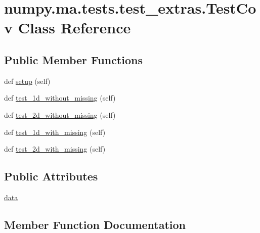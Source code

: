 \hypertarget{classnumpy_1_1ma_1_1tests_1_1test__extras_1_1TestCov}{}\section{numpy.\+ma.\+tests.\+test\+\_\+extras.\+Test\+Cov Class Reference}
\label{classnumpy_1_1ma_1_1tests_1_1test__extras_1_1TestCov}
\subsection*{Public Member Functions}
\begin{DoxyCompactItemize}
\item 
def \hyperlink{classnumpy_1_1ma_1_1tests_1_1test__extras_1_1TestCov_af70f7561cb4532728f821f8801599429}{setup} (self)
\item 
def \hyperlink{classnumpy_1_1ma_1_1tests_1_1test__extras_1_1TestCov_ae62ba38c254eceadd736d201bf7806ff}{test\+\_\+1d\+\_\+without\+\_\+missing} (self)
\item 
def \hyperlink{classnumpy_1_1ma_1_1tests_1_1test__extras_1_1TestCov_affe3808636bf0fb4e0b767e574505f16}{test\+\_\+2d\+\_\+without\+\_\+missing} (self)
\item 
def \hyperlink{classnumpy_1_1ma_1_1tests_1_1test__extras_1_1TestCov_a55553c4677fbbbce459e7cfe34913bc8}{test\+\_\+1d\+\_\+with\+\_\+missing} (self)
\item 
def \hyperlink{classnumpy_1_1ma_1_1tests_1_1test__extras_1_1TestCov_a24516de19ee9a805d8f28bfeae8e1075}{test\+\_\+2d\+\_\+with\+\_\+missing} (self)
\end{DoxyCompactItemize}
\subsection*{Public Attributes}
\begin{DoxyCompactItemize}
\item 
\hyperlink{classnumpy_1_1ma_1_1tests_1_1test__extras_1_1TestCov_af3324a06d29845f8c10efab37829cc17}{data}
\end{DoxyCompactItemize}


\subsection{Member Function Documentation}
\mbox{\label{classnumpy_1_1ma_1_1tests_1_1test__extras_1_1TestCov_af70f7561cb4532728f821f8801599429}} 
